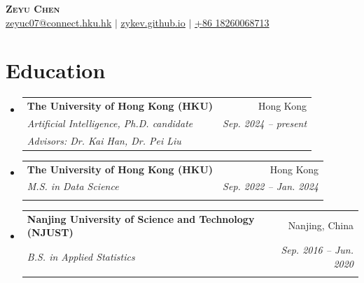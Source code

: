 \documentclass[letterpaper,10pt]{article}
\makeatletter
\newcommand{\resumeItem}[1]{
  \item\small{
    {#1 \vspace{-2pt}}
  }
}
\newcommand{\resumeSubheading}[5]{
  \vspace{2pt}\item
    \begin{tabular*}{0.97\textwidth}[t]{l@{\extracolsep{\fill}}r}
      \textbf{#1} & #2 \\
      \textit{\small#3} & \textit{\small #4}
      \if\relax\detokenize{#5}\relax\else \\
        \multicolumn{2}{l}{\small\textit{#5}}
      \fi
    \end{tabular*}\vspace{-1pt}
}
\newcommand{\resumeSubHeadingListStart}{\begin{itemize}[leftmargin=0.15in, label={}]}
\newcommand{\resumeSubHeadingListEnd}{\end{itemize}}
\newcommand{\resumeItemListStart}{\begin{itemize}}
\newcommand{\resumeItemListEnd}{\end{itemize}\vspace{-0pt}}
\makeatother
\begin{document}
\begin{center}
    \textbf{\LARGE \scshape Zeyu Chen} \\ \vspace{1pt}
    \small
    \underline{zeyuc07@connect.hku.hk} $|$
    \href{https://zykev.github.io/}{\underline{zykev.github.io}} $|$
    \underline{+86 18260068713}
\end{center}


\section{Education}
  \resumeSubHeadingListStart
    \resumeSubheading
      {The University of Hong Kong (HKU)}{Hong Kong}
      {Artificial Intelligence, Ph.D. candidate}{Sep. 2024 -- present}
      {Advisors: Dr. Kai Han, Dr. Pei Liu}
    \resumeSubheading
      {The University of Hong Kong (HKU)}{Hong Kong}
      {M.S. in Data Science}{Sep. 2022 -- Jan. 2024}
      {}
    \resumeSubheading
      {Nanjing University of Science and Technology (NJUST)}{Nanjing, China}
      {B.S. in Applied Statistics}{Sep. 2016 -- Jun. 2020}
      {}

  \resumeSubHeadingListEnd



\end{document}
